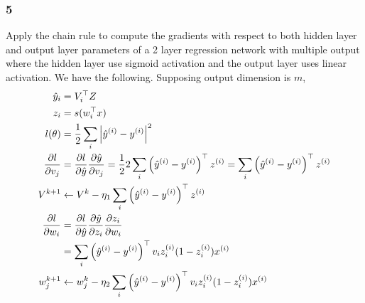\documentclass{article}
\begin{document}
\subsubsection*{5}
\begin{myleftlinebox}
    Apply the chain rule to compute the gradients with respect to both hidden layer and output layer parameters of a 2 layer regression network with multiple output where the hidden layer use sigmoid activation and the output layer uses linear activation.
    \tcbline
    We have the following. Supposing output dimension is \(m\),
    \begin{equation*}
        \begin{split}
            \hat y_i &= V_i^\top Z\\
            z_i &= s(w_i^\top x)\\
            l(\theta) &= \frac{1}{2}\sum_i \left\vert\hat y^{(i)}-y^{(i)}\right\vert^2\\
            \frac{\partial l}{\partial v_j} &= \frac{\partial l}{\partial \hat y}\frac{\partial \hat y}{\partial v_j} = \frac{1}{2} 2 \sum_i \left( \hat y^{(i)}-y^{(i)} \right)^\top z^{(i)}=\sum_i \left( \hat y^{(i)}-y^{(i)} \right)^\top z^{(i)}\\
            V^{k+1} &\gets V^{k}-\eta_1  \sum_i \left( \hat y^{(i)}-y^{(i)} \right)^\top z^{(i)}\\
            \frac{\partial l}{\partial w_i} &= \frac{\partial l}{\partial \hat y}\frac{\partial\hat y}{\partial z_i}\frac{\partial z_i}{\partial w_i}\\
            &=\sum_i  \left( \hat y^{(i)}-y^{(i)} \right)^\top v_i z^{(i)}_i(1-z^{(i)}_i)x^{(i)}\\
            w_j^{k+1} &\gets w_j^k-\eta_2  \sum_i  \left( \hat y^{(i)}-y^{(i)} \right)^\top v_i z^{(i)}_i(1-z^{(i)}_i)x^{(i)}
        \end{split}    
    \end{equation*}

\end{myleftlinebox}
\end{document}
